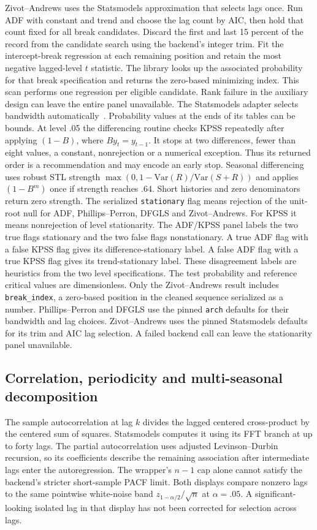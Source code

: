 Zivot--Andrews uses the Statsmodels approximation that selects lags once.
Run ADF with constant and trend and choose the lag count by AIC, then
hold that count fixed for all break candidates. Discard the first and last
15 percent of the record from the candidate search using the backend's
integer trim. Fit the intercept-break regression at each remaining
position and retain the most negative lagged-level $t$ statistic. The
library looks up the associated probability for that break specification
and returns the zero-based minimizing index. This scan performs one
regression per eligible candidate. Rank failure in the auxiliary design
can leave the entire panel unavailable.
The Statsmodels adapter selects bandwidth automatically~\cite{kpss}. Probability values at the ends of its tables can be bounds. At level .05 the differencing routine checks KPSS repeatedly after applying $(1-B)$, where $B y_t=y_{t-1}$. It stops at two differences, fewer than eight values, a constant, nonrejection or a numerical exception. Thus its returned order is a recommendation and may encode an early stop. Seasonal differencing uses robust STL strength $\max(0,1-\mathrm{Var}(R)/\mathrm{Var}(S+R))$ and applies $(1-B^m)$ once if strength reaches .64. Short histories and zero denominators return zero strength. The serialized \texttt{stationary} flag means rejection of the unit-root null for ADF, Phillips--Perron, DFGLS and Zivot--Andrews. For KPSS it means nonrejection of level stationarity. The ADF/KPSS panel labels the two true flags stationary and the two false flags nonstationary. A true ADF flag with a false KPSS flag gives its difference-stationary label. A false ADF flag with a true KPSS flag gives its trend-stationary label. These disagreement labels are heuristics from the two level specifications. The test probability and reference critical values are dimensionless. Only the Zivot--Andrews result includes \texttt{break\_index}, a zero-based position in the cleaned sequence serialized as a number. Phillips--Perron and DFGLS use the pinned \texttt{arch} defaults for their bandwidth and lag choices. Zivot--Andrews uses the pinned Statsmodels defaults for its trim and AIC lag selection. A failed backend call can leave the stationarity panel unavailable.

\subsection{Correlation, periodicity and multi-seasonal decomposition}
\label{sec:diagnostic-autocorrelation}
The sample autocorrelation at lag $k$ divides the lagged centered cross-product by the centered sum of squares. Statsmodels computes it using its FFT branch at up to forty lags. The partial autocorrelation uses adjusted Levinson--Durbin recursion, so its coefficients describe the remaining association after intermediate lags enter the autoregression. The wrapper's $n-1$ cap alone cannot satisfy the backend's stricter short-sample PACF limit. Both displays compare nonzero lags to the same pointwise white-noise band $z_{1-\alpha/2}/\sqrt{n}$ at $\alpha=.05$. A significant-looking isolated lag in that display has not been corrected for selection across lags.


